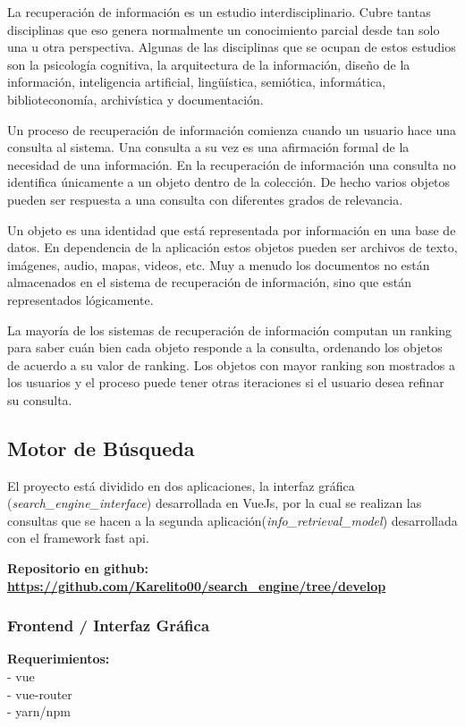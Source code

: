 \documentclass{llncs}
\begin{document}
La recuperación de información es un estudio interdisciplinario. Cubre tantas disciplinas que eso genera normalmente un conocimiento parcial desde tan solo una u otra perspectiva. Algunas de las disciplinas que se ocupan de estos estudios son la psicología cognitiva, la arquitectura de la información, diseño de la información, inteligencia artificial, lingüística, semiótica, informática, biblioteconomía, archivística y documentación.

Un proceso de recuperación de información comienza cuando un usuario hace una consulta al sistema. Una consulta a su vez es una afirmación formal de la necesidad de una información. En la recuperación de información una consulta no identifica únicamente a un objeto dentro de la colección. De hecho varios objetos pueden ser respuesta a una consulta con diferentes grados de relevancia.

Un objeto es una identidad que está representada por información en una base de datos. En dependencia de la aplicación estos objetos pueden ser archivos de texto, imágenes, audio, mapas, videos, etc. Muy a menudo los documentos no están almacenados en el sistema de recuperación de información, sino que están representados lógicamente.

La mayoría de los sistemas de recuperación de información computan un ranking para saber cuán bien cada objeto responde a la consulta, ordenando los objetos de acuerdo a su valor de ranking. Los objetos con mayor ranking son mostrados a los usuarios y el proceso puede tener otras iteraciones si el usuario desea refinar su consulta.

\subsection{Motor de Búsqueda}

El proyecto está dividido en dos aplicaciones, la interfaz gráfica (\textit{search\_engine\_interface}) desarrollada en VueJs, por la cual se realizan las consultas que se hacen a la segunda aplicación(\textit{info\_retrieval\_model}) desarrollada con el framework fast api.

\textbf{Repositorio en github: \url{https://github.com/Karelito00/search_engine/tree/develop}}

\subsubsection{Frontend / Interfaz Gráfica} \hfill

\textbf{Requerimientos:} \\
- vue \\
- vue-router \\
- yarn/npm \\
\end{document}
